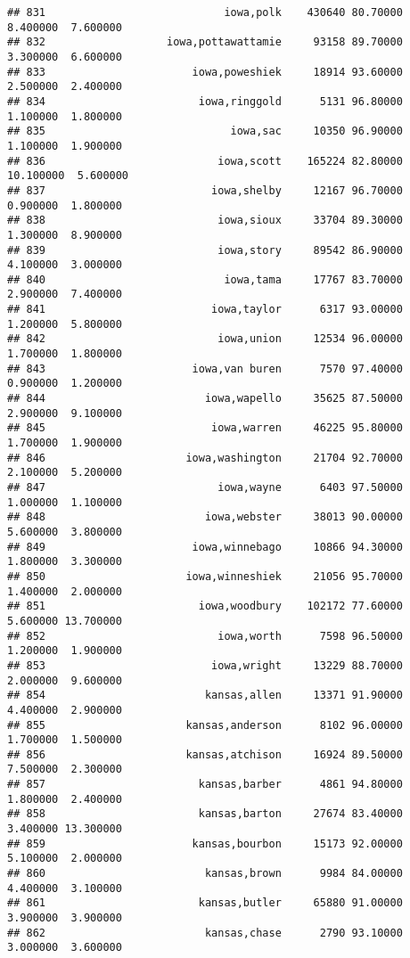 \documentclass[
]{article}
\begin{document}
\begin{verbatim}
## 831                            iowa,polk    430640 80.70000  8.400000  7.600000
## 832                   iowa,pottawattamie     93158 89.70000  3.300000  6.600000
## 833                       iowa,poweshiek     18914 93.60000  2.500000  2.400000
## 834                        iowa,ringgold      5131 96.80000  1.100000  1.800000
## 835                             iowa,sac     10350 96.90000  1.100000  1.900000
## 836                           iowa,scott    165224 82.80000 10.100000  5.600000
## 837                          iowa,shelby     12167 96.70000  0.900000  1.800000
## 838                           iowa,sioux     33704 89.30000  1.300000  8.900000
## 839                           iowa,story     89542 86.90000  4.100000  3.000000
## 840                            iowa,tama     17767 83.70000  2.900000  7.400000
## 841                          iowa,taylor      6317 93.00000  1.200000  5.800000
## 842                           iowa,union     12534 96.00000  1.700000  1.800000
## 843                       iowa,van buren      7570 97.40000  0.900000  1.200000
## 844                         iowa,wapello     35625 87.50000  2.900000  9.100000
## 845                          iowa,warren     46225 95.80000  1.700000  1.900000
## 846                      iowa,washington     21704 92.70000  2.100000  5.200000
## 847                           iowa,wayne      6403 97.50000  1.000000  1.100000
## 848                         iowa,webster     38013 90.00000  5.600000  3.800000
## 849                       iowa,winnebago     10866 94.30000  1.800000  3.300000
## 850                      iowa,winneshiek     21056 95.70000  1.400000  2.000000
## 851                        iowa,woodbury    102172 77.60000  5.600000 13.700000
## 852                           iowa,worth      7598 96.50000  1.200000  1.900000
## 853                          iowa,wright     13229 88.70000  2.000000  9.600000
## 854                         kansas,allen     13371 91.90000  4.400000  2.900000
## 855                      kansas,anderson      8102 96.00000  1.700000  1.500000
## 856                      kansas,atchison     16924 89.50000  7.500000  2.300000
## 857                        kansas,barber      4861 94.80000  1.800000  2.400000
## 858                        kansas,barton     27674 83.40000  3.400000 13.300000
## 859                       kansas,bourbon     15173 92.00000  5.100000  2.000000
## 860                         kansas,brown      9984 84.00000  4.400000  3.100000
## 861                        kansas,butler     65880 91.00000  3.900000  3.900000
## 862                         kansas,chase      2790 93.10000  3.000000  3.600000

\end{verbatim}
\end{document}
